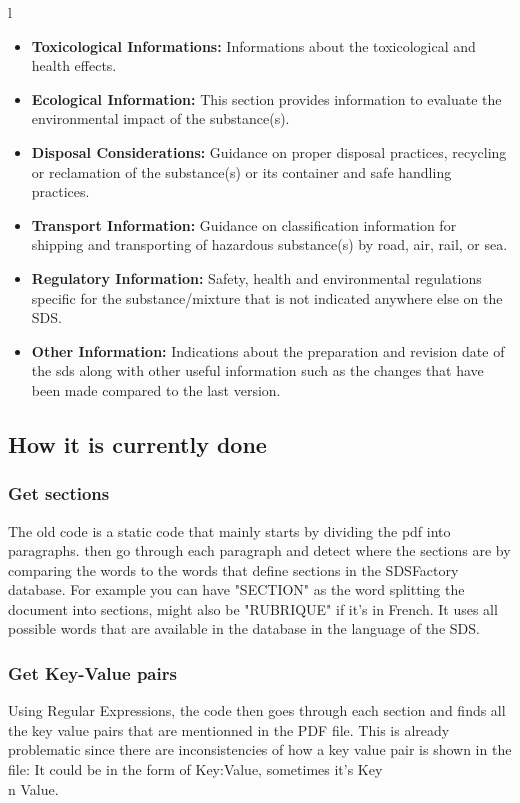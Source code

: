 l\documentclass[a4paper,12pt,twoside]{report}
\begin{document}
\begin{itemize}
\item \textbf{Toxicological Informations:} Informations about the toxicological and health effects.
\item \textbf{Ecological Information:} This section provides information to evaluate the environmental impact of the substance(s).
\item \textbf{Disposal Considerations:} Guidance on proper disposal practices, recycling or reclamation of the substance(s) or its container and safe handling practices.
\item \textbf{Transport Information:} Guidance on classification information for shipping and transporting of hazardous substance(s) by road, air, rail, or sea.
\item \textbf{Regulatory Information:} Safety, health and environmental regulations specific for the substance/mixture that is not indicated anywhere else on the SDS.
\item \textbf{Other Information:} Indications about the preparation and revision date of the sds along with other useful information such as the changes that have been made compared to the last version. 
\end{itemize}
\subsection{How it is currently done}

\subsubsection{Get sections}
The old code is a static code that mainly starts by dividing the pdf into paragraphs. then go through each paragraph and detect where the sections are by comparing the words to the words that define sections in the SDSFactory database. For example you can have "SECTION" as the word splitting the document into sections, might also be "RUBRIQUE" if it's in French. It uses all possible words that are available in the database in the language of the SDS.
\subsubsection{Get Key-Value pairs}
Using Regular Expressions, the code then goes through each section and finds all the key value pairs that are mentionned in the PDF file. This is already problematic since there are inconsistencies of how a key value pair is shown in the file: It could be in the form of Key:Value, sometimes it's Key \\n Value.
\end{document}
